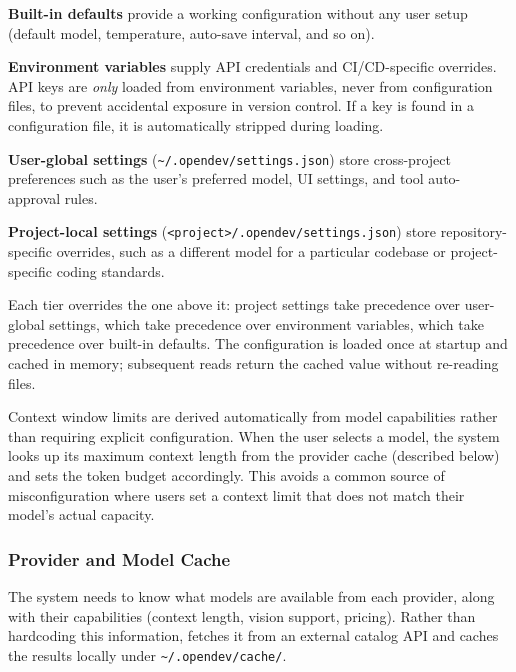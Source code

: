 \begin{packedenumerate}
\item \textbf{Built-in defaults} provide a working configuration without any user setup (default model, temperature, auto-save interval, and so on).
\item \textbf{Environment variables} supply API credentials and CI/CD-specific overrides. API keys are \emph{only} loaded from environment variables, never from configuration files, to prevent accidental exposure in version control. If a key is found in a configuration file, it is automatically stripped during loading.
\item \textbf{User-global settings} (\texttt{\textasciitilde/.opendev/settings.json}) store cross-project preferences such as the user's preferred model, UI settings, and tool auto-approval rules.
\item \textbf{Project-local settings} (\texttt{\textless project\textgreater/.opendev/settings.json}) store repository-specific overrides, such as a different model for a particular codebase or project-specific coding standards.
\end{packedenumerate}

Each tier overrides the one above it: project settings take precedence over user-global settings, which take precedence over environment variables, which take precedence over built-in defaults. The configuration is loaded once at startup and cached in memory; subsequent reads return the cached value without re-reading files.

Context window limits are derived automatically from model capabilities rather than requiring explicit configuration. When the user selects a model, the system looks up its maximum context length from the provider cache (described below) and sets the token budget accordingly. This avoids a common source of misconfiguration where users set a context limit that does not match their model's actual capacity.

\subsubsection{Provider and Model Cache}
\label{sec:provider_cache}

The system needs to know what models are available from each provider, along with their capabilities (context length, vision support, pricing). Rather than hardcoding this information, \name fetches it from an external catalog API and caches the results locally under \texttt{\textasciitilde/.opendev/cache/}.

